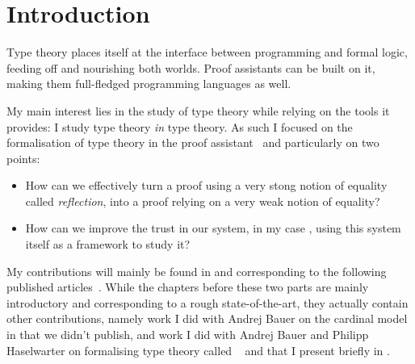 \chapter{Introduction}


Type theory places itself at the interface between programming and formal logic,
feeding off and nourishing both worlds. Proof assistants can be built on it,
making them full-fledged programming languages as well.

My main interest lies in the study of type theory while relying on the tools it
provides: I study type theory \emph{in} type theory.
As such I focused on the formalisation of type theory in the \Coq proof
assistant~ and particularly on two points:
\begin{itemize}
  \item How can we effectively turn a proof using a very stong notion of
  equality called \emph{reflection}, into a proof relying on a very weak notion
  of equality?
  \item How can we improve the trust in our system, in my case \Coq, using this
  system itself as a framework to study it?
\end{itemize}

My contributions will mainly be found in  and
 corresponding to the following published
articles~.
While the chapters before these two parts are mainly introductory and
corresponding to a rough state-of-the-art, they actually contain other
contributions, namely work I did with Andrej Bauer on the cardinal model
in  that we didn't publish, and work I did with Andrej Bauer
and Philipp Haselwarter on formalising type theory called
\ftt~ and that I present briefly in
.